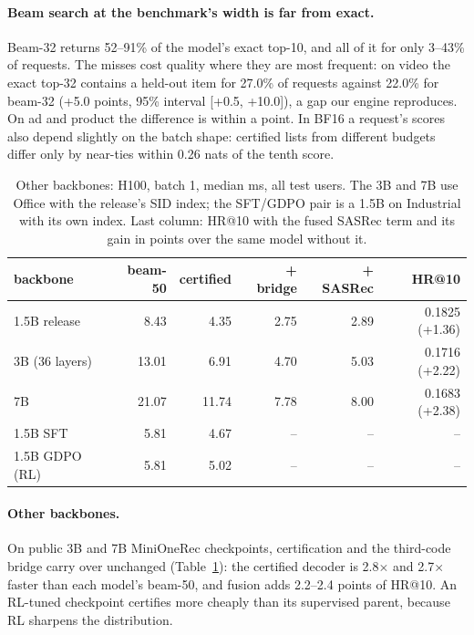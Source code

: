 \documentclass[sigconf,anonymous]{acmart}
\begin{document}
\paragraph{Beam search at the benchmark's width is far from exact.} Beam-32 returns 52--91\% of the model's exact
top-10, and all of it for only 3--43\% of requests. The misses cost quality where they are most frequent: on video
the exact top-32 contains a held-out item for 27.0\% of requests against 22.0\% for beam-32 (+5.0 points, 95\%
interval [+0.5, +10.0]), a gap our engine reproduces. On ad and product the difference is within a point. In BF16 a
request's scores also depend slightly on the batch shape: certified lists from different budgets differ only by
near-ties within 0.26 nats of the tenth score.

\begin{table}[t]
\caption{Other backbones: H100, batch 1, median ms, all test users. The 3B and 7B use Office with the release's
SID index; the SFT/GDPO pair is a 1.5B on Industrial with its own index. Last column: HR@10 with the fused SASRec
term and its gain in points over the same model without it.}
\label{tab:backbones}
\vspace{-2mm}
\footnotesize
\setlength{\tabcolsep}{2.5pt}
\begin{tabular*}{\linewidth}{@{\extracolsep{\fill}}lrrrrr@{}}
\toprule
backbone & beam-50 & certified & + bridge & + SASRec & HR@10 \\
\midrule
1.5B release   & 8.43  & 4.35  & 2.75 & 2.89 & 0.1825 (+1.36) \\
3B (36 layers) & 13.01 & 6.91  & 4.70 & 5.03 & 0.1716 (+2.22) \\
7B             & 21.07 & 11.74 & 7.78 & 8.00 & 0.1683 (+2.38) \\
1.5B SFT       & 5.81  & 4.67  & --   & --   & -- \\
1.5B GDPO (RL) & 5.81  & 5.02  & --   & --   & -- \\
\bottomrule
\end{tabular*}
\vspace{-3mm}
\end{table}

\paragraph{Other backbones.} On public 3B and 7B MiniOneRec checkpoints, certification and the third-code bridge
carry over unchanged (Table~\ref{tab:backbones}): the certified decoder is 2.8$\times$ and 2.7$\times$ faster than each model's beam-50, and
fusion adds 2.2--2.4 points of HR@10. An RL-tuned checkpoint certifies more cheaply than its supervised parent,
because RL sharpens the distribution.
\end{document}
